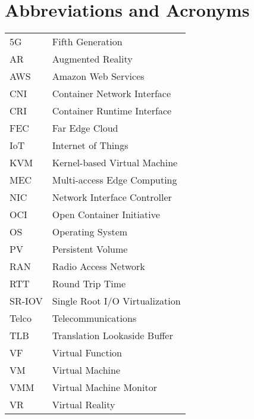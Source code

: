 \chapter*{Abbreviations and Acronyms}

\noindent
\begin{longtable}{@{}p{}p{}@{}}
5G & Fifth Generation \\
AR & Augmented Reality \\
AWS & Amazon Web Services \\
CNI & Container Network Interface \\
CRI & Container Runtime Interface \\
FEC & Far Edge Cloud \\
IoT & Internet of Things \\
KVM & Kernel-based Virtual Machine \\
MEC & Multi-access Edge Computing \\
NIC & Network Interface Controller \\
OCI & Open Container Initiative \\
OS & Operating System \\
PV & Persistent Volume \\
RAN & Radio Access Network \\
RTT & Round Trip Time \\
SR-IOV & Single Root I/O Virtualization \\
Telco & Telecommunications \\
TLB & Translation Lookaside Buffer \\
VF & Virtual Function \\
VM & Virtual Machine \\
VMM & Virtual Machine Monitor \\
VR & Virtual Reality\\
\end{longtable}
